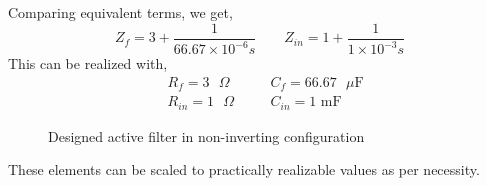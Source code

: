 Comparing equivalent terms, we get,
\begin{equation*}
    Z_f=3+\frac{1}{66.67\times10^{-6}s} \quad \quad Z_{in}=1+\frac{1}{1\times10^{-3}s}
\end{equation*}
This can be realized with,
\begin{equation*}
\begin{aligned}
   & R_f=3\text{ }\Omega\quad  &&C_f=66.67 \text{ }\mu \text{F} \\ 
    &R_{in}=1\text{ }\Omega \quad &&C_{in}=1\text{ mF}
\end{aligned}
\end{equation*}
\begin{figure}[H]
    \centering
    \fignoninvertingsolution
    \caption{Designed active filter in non-inverting configuration}
    \label{fig:non-inv-solution}
\end{figure}
These elements can be scaled to practically realizable values as per necessity.